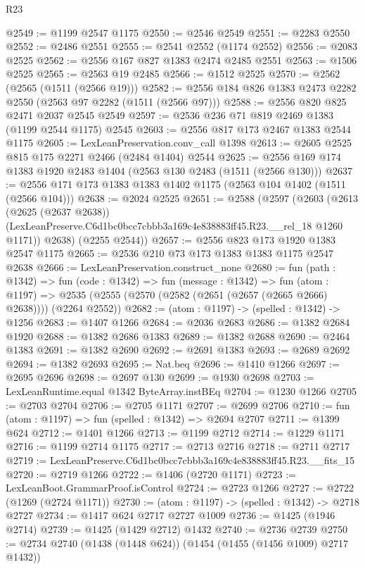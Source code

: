 \begin{lexlean}{R23}
\begin{coremodule}
@2549 := @1199 @2547 @1175
@2550 := @2546 @2549
@2551 := @2283 @2550
@2552 := @2486 @2551
@2555 := @2541 @2552 (@1174 @2552)
@2556 := @2083 @2525
@2562 := @2556 @167 @827 @1383 @2474 @2485 @2551
@2563 := @1506 @2525
@2565 := @2563 @19 @2485
@2566 := @1512 @2525
@2570 := @2562 (@2565 (@1511 (@2566 @19)))
@2582 := @2556 @184 @826 @1383 @2473 @2282 @2550 (@2563 @97 @2282 (@1511 (@2566 @97)))
@2588 := @2556 @820 @825 @2471 @2037 @2545 @2549
@2597 := @2536 @236 @71 @819 @2469 @1383 (@1199 @2544 @1175) @2545
@2603 := @2556 @817 @173 @2467 @1383 @2544 @1175
@2605 := LexLeanPreservation.conv_call @1398
@2613 := @2605 @2525 @815 @175 @2271 @2466 (@2484 @1404) @2544
@2625 := @2556 @169 @174 @1383 @1920 @2483 @1404 (@2563 @130 @2483 (@1511 (@2566 @130)))
@2637 := @2556 @171 @173 @1383 @1383 @1402 @1175 (@2563 @104 @1402 (@1511 (@2566 @104)))
@2638 := @2024 @2525
@2651 := @2588
    (@2597
      (@2603
        (@2613
          (@2625 (@2637 @2638))
          (LexLeanPreserve.C6d1bc0bcc7cbbb3a169c4e838883ff45.R23.__rel_18 @1260 @1171))
        @2638)
      (@2255 @2544))
@2657 := @2556 @823 @173 @1920 @1383 @2547 @1175
@2665 := @2536 @210 @73 @173 @1383 @1383 @1175 @2547 @2638
@2666 := LexLeanPreservation.construct_none
@2680 := fun (path : @1342) =>
  fun (code : @1342) =>
  fun (message : @1342) =>
  fun (atom : @1197) =>
  @2535 (@2555 (@2570 (@2582 (@2651 (@2657 (@2665 @2666) @2638)))) (@2264 @2552))
@2682 := (atom : @1197) -> (spelled : @1342) -> @1256
@2683 := @1407 @1266
@2684 := @2036 @2683
@2686 := @1382 @2684 @1920
@2688 := @1382 @2686 @1383
@2689 := @1382 @2688
@2690 := @2464 @1383
@2691 := @1382 @2690
@2692 := @2691 @1383
@2693 := @2689 @2692
@2694 := @1382 @2693
@2695 := Nat.beq
@2696 := @1410 @1266
@2697 := @2695 @2696
@2698 := @2697 @130
@2699 := @1930 @2698
@2703 := LexLeanRuntime.equal @1342 ByteArray.instBEq
@2704 := @1230 @1266
@2705 := @2703 @2704
@2706 := @2705 @1171
@2707 := @2699 @2706
@2710 := fun (atom : @1197) => fun (spelled : @1342) => @2694 @2707
@2711 := @1399 @624
@2712 := @1401 @1266
@2713 := @1199 @2712
@2714 := @1229 @1171
@2716 := @1199 @2714 @1175
@2717 := @2713 @2716
@2718 := @2711 @2717
@2719 := LexLeanPreserve.C6d1bc0bcc7cbbb3a169c4e838883ff45.R23.__fits_15
@2720 := @2719 @1266
@2722 := @1406 (@2720 @1171)
@2723 := LexLeanBoot.GrammarProof.isControl
@2724 := @2723 @1266
@2727 := @2722 (@1269 (@2724 @1171))
@2730 := (atom : @1197) -> (spelled : @1342) -> @2718 @2727
@2734 := @1417 @624 @2717 @2727 @1009
@2736 := @1425 (@1946 @2714)
@2739 := @1425 (@1429 @2712) @1432
@2740 := @2736 @2739
@2750 := @2734 @2740 (@1438 (@1448 @624)) (@1454 (@1455 (@1456 @1009) @2717 @1432))

\end{coremodule}
\end{lexlean}
